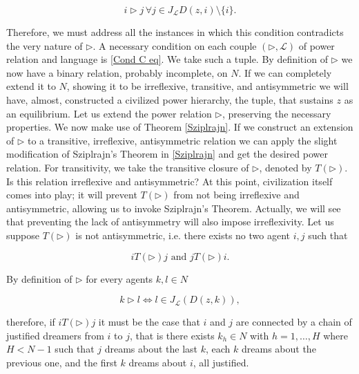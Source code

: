 \begin{equation}\label{Cond C eq}
    i\triangleright j\,\forall j\in J_{\mathcal{L}}D(z,i)\setminus\{i\}.
\end{equation}

Therefore, we must address all the instances in which this condition contradicts the very nature of $\triangleright$. A necessary condition on each couple $(\triangleright,\mathcal{L})$ of power relation and language is \ref{Cond C eq}. We take such a tuple. By definition of $\triangleright$ we now have a binary relation, probably incomplete, on $N$. If we can completely extend it to $N$, showing it to be irreflexive, transitive, and antisymmetric we will have, almost, constructed a civilized power hierarchy, the tuple, that sustains $z$ as an equilibrium. Let us extend the power relation $\triangleright$, preserving the necessary properties. We now make use of Theorem \ref{Sziplrajn}. If we construct an extension of $\triangleright$ to a transitive, irreflexive, antisymmetric relation we can apply the slight modification of Sziplrajn's Theorem in \cref{Sziplrajn} and get the desired power relation. For transitivity, we take the transitive closure of $\triangleright$, denoted by $T(\triangleright)$. Is this relation irreflexive and antisymmetric? At this point, civilization itself comes into play; it will prevent $T(\triangleright)$ from not being irreflexive and antisymmetric, allowing us to invoke Sziplrajn's Theorem. Actually, we will see that preventing the lack of antisymmetry will also impose irreflexivity. Let us suppose $T(\triangleright)$ is not antisymmetric, i.e. there exists no two agent $i,j$ such that 

\[iT(\triangleright)j \text{ and }jT(\triangleright)i.\]

By definition of $\triangleright$ for every agents $k,l\in N$

\[k\triangleright l \Leftrightarrow l\in J_{\mathcal{L}}(D(z,k)),\]

therefore, if $iT(\triangleright)j$ it must be the case that $i$ and $j$ are connected by a chain of justified dreamers from $i$ to $j$, that is there exists $k_{h}\in N$ with $h=1,\dots,H$ where $H<N-1$ such that $j$ dreams about the last $k$, each $k$ dreams about the previous one, and the first $k$ dreams about $i$, all justified. 


